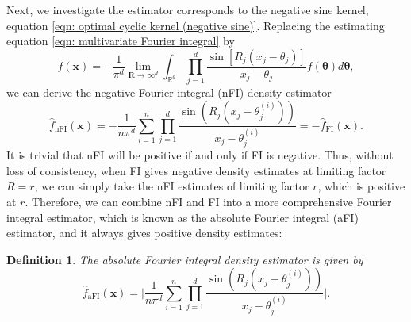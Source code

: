 \documentclass[%
 reprint,
 amsmath,amssymb,
 aps,
]{revtex4-2}
\newtheorem{definition}[theorem]{Definition}
\def\R{\mathbb{R}}
\def\btheta{\boldsymbol{\theta}}
\def\xbold{\mathbf{x}}
\def\Rbold{\mathbf{R}}
\begin{document}
Next, we investigate the estimator corresponds to the negative sine kernel, equation 
\eqref{eqn: optimal cyclic kernel (negative sine)}. Replacing the estimating equation \eqref{eqn: multivariate Fourier integral} by
\begin{equation} \label{eqn: negative multivariate Fourier integral}
    f(\xbold) = -\frac{1}{\pi^d} \lim_{\Rbold \to \infty^d} \int_{\R^d} \prod_{j=1}^d \frac{\sin[R_j(x_j-\theta_j)]}{x_j-\theta_j} f(\btheta)d\btheta,
\end{equation}
we can derive the negative Fourier integral (nFI) density estimator
\begin{equation} \label{eqn: multivariate negative Fourier integral density estimator}
    \hat{f}_\text{nFI}(\mathbf{x}) = -\frac{1}{n\pi^d}\sum_{i = 1}^n \prod_{j = 1}^d \frac{\sin(R_j(x_j - \theta_j^{(i)}))}{x_j - \theta_j^{(i)}} = -\hat{f}_\text{FI}(\mathbf{x}).
\end{equation}
It is trivial that nFI will be positive if and only if FI is negative. Thus, without loss of consistency, when FI gives negative density estimates at limiting factor $R=r$, we can simply take the nFI estimates of limiting factor $r$, which is positive at $r$. Therefore, we can combine nFI and FI into a more comprehensive Fourier integral estimator, which is known as the absolute Fourier integral (aFI) estimator, and it always gives positive density estimates:
\begin{definition}
    The absolute Fourier integral density estimator is given by
    \begin{equation} \label{eqn: absolute Fourier integral estimator}
        \hat{f}_\text{aFI}(\mathbf{x}) = \bigg|\frac{1}{n\pi^d}\sum_{i = 1}^n \prod_{j = 1}^d \frac{\sin(R_j(x_j - \theta_j^{(i)}))}{x_j - \theta_j^{(i)}}\bigg|.
    \end{equation}
\end{definition}
\end{document}
